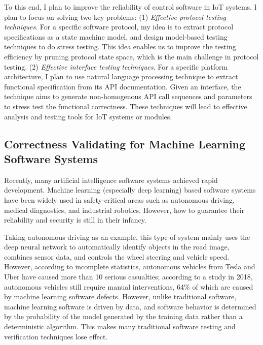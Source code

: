 \documentclass[a4paper]{article}
\begin{document}
To this end, I plan to improve the reliability of control software in
IoT systems. I plan to focus on solving two key problems: 
(1) \emph{Effective protocol testing techniques}. 
For a specific software protocol, my idea is to extract protocol specifications as a state machine model, and design model-based testing techniques to do stress testing. 
This idea enables us to improve the testing efficiency by pruning protocol state space,
which is the main challenge in protocol testing.
(2) \emph{Effective interface testing techniques}.
For a specific platform architecture, I plan to use natural language processing technique to extract functional specification from its API documentation. 
Given an interface, the technique aims to generate non-homogenous API call sequences and parameters to stress test the functional correctness.
These techniques will lead to effective analysis and testing tools for IoT systems or modules.

\subsection{Correctness Validating for Machine Learning Software Systems}

Recently, many artificial intelligence software systems achieved rapid development. Machine learning (especially deep learning) based software systems have been widely used in safety-critical areas such as autonomous driving, medical diagnostics, and industrial robotics. However, how to guarantee their reliability and security is still in their infancy. 

Taking autonomous driving as an example, this type of system mainly uses the deep neural network to automatically identify objects in the road image, combines sensor data, and controls the wheel steering and vehicle speed. However, according to incomplete statistics,
autonomous vehicles from Tesla and Uber have caused more than 10 serious casualties; 
according to a study in 2018, autonomous vehicles still require manual interventions, 64\% of which are caused by machine learning software defects.
However, unlike traditional software, machine learning software is driven by data, and software behavior is determined by the probability of the model generated by the training data rather than
a deterministic algorithm. This makes many traditional software testing and verification techniques lose effect.
\end{document}
